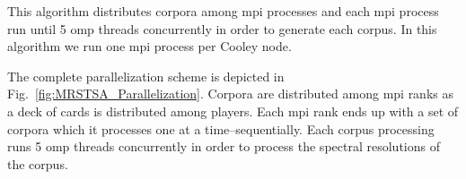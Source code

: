 \documentclass[11pt,a4paper]{article}
\begin{document}
\begin{algorithm}
	\caption{This algorithm distributes corpora among \gls{mpi} processes and each \gls{mpi} process run until 5 \gls{omp} threads concurrently in order to generate each corpus. In this algorithm we run one \gls{mpi} process per Cooley node.}
\label{input_generation_parallelization}
\begin{algorithmic}[1]
	\ENDFOR
\end{algorithmic}
\end{algorithm}

The complete parallelization scheme is depicted in Fig.~\ref{fig:MRSTSA_Parallelization}. Corpora are distributed among \gls{mpi} ranks as a deck of cards is distributed among players. Each \gls{mpi} rank ends up with a set of corpora which it processes one at a time--sequentially. Each corpus processing runs 5 \gls{omp} threads concurrently in order to process the spectral resolutions of the corpus. 
\end{document}
